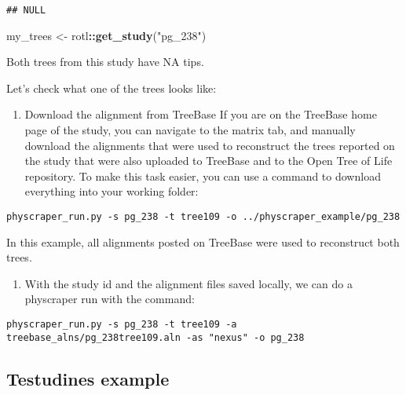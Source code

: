 \documentclass[]{article}
\newenvironment{Shaded}{\begin{snugshade}}{\end{snugshade}}
\newcommand{\KeywordTok}[1]{\textcolor[rgb]{0.13,0.29,0.53}{\textbf{#1}}}
\newcommand{\NormalTok}[1]{#1}
\newcommand{\OperatorTok}[1]{\textcolor[rgb]{0.81,0.36,0.00}{\textbf{#1}}}
\newcommand{\StringTok}[1]{\textcolor[rgb]{0.31,0.60,0.02}{#1}}
\providecommand{\tightlist}{%
  \setlength{\itemsep}{0pt}\setlength{\parskip}{0pt}}
\begin{document}
\begin{verbatim}
## NULL
\end{verbatim}

\begin{Shaded}
\begin{Highlighting}[]
\NormalTok{my_trees <-}\StringTok{ }\NormalTok{rotl}\OperatorTok{::}\KeywordTok{get_study}\NormalTok{(}\StringTok{"pg_238"}\NormalTok{)}
\end{Highlighting}
\end{Shaded}

Both trees from this study have NA tips.

Let's check what one of the trees looks like:

\begin{enumerate}
\def\labelenumi{\arabic{enumi}.}
\tightlist
\item
  Download the alignment from TreeBase
  If you are on the TreeBase home page of the study, you can navigate to the matrix tab, and manually download the alignments that were used to reconstruct the trees reported on the study that were also uploaded to TreeBase and to the Open Tree of Life repository.
  To make this task easier, you can use a command to download everything into your working folder:
\end{enumerate}

\begin{verbatim}
physcraper_run.py -s pg_238 -t tree109 -o ../physcraper_example/pg_238
\end{verbatim}

In this example, all alignments posted on TreeBase were used to reconstruct both trees.

\begin{enumerate}
\def\labelenumi{\arabic{enumi}.}
\tightlist
\item
  With the study id and the alignment files saved locally, we can do a physcraper run with the command:
\end{enumerate}

\begin{verbatim}
physcraper_run.py -s pg_238 -t tree109 -a treebase_alns/pg_238tree109.aln -as "nexus" -o pg_238
\end{verbatim}

\hypertarget{testudines-example}{%
\subsection{Testudines example}\label{testudines-example}}
\end{document}
